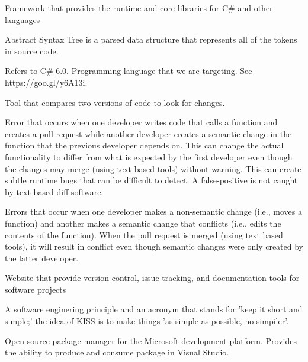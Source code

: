 \documentclass[draftclsnofoot,onecolumn]{IEEEtran}
\begin{document}
\begin{description} 

\item[.NET:] Framework that provides the runtime and core libraries for C\# 
and other languages

\item[AST:] Abstract Syntax Tree is a parsed data structure that represents 
all of the tokens in source code.

\item[C\#:] Refers to C\# 6.0. Programming language that we are targeting. 
See https://goo.gl/y6A13i.

\item[Diff:] Tool that compares two versions of code to look for changes.

\item[False-Positive:] Error that occurs when one developer writes code that 
calls a function and creates a pull request while another developer creates a 
semantic change in the function that the previous developer depends on. This 
can change the actual functionality to differ from what is expected by the 
first developer even though the changes may merge (using text based tools) 
without warning. This can create subtle runtime bugs that can be difficult to 
detect. A false-positive is not caught by text-based diff software.

\item[False-Negative:] Errors that occur when one developer makes a 
non-semantic change (i.e., moves a function) and another makes a semantic 
change that conflicts (i.e., edits the contents of the function). When the 
pull request is merged (using text based tools), it will result in conflict 
even though semantic changes were only created by the latter developer.

\item[GitHub:] Website that provide version control, issue tracking, and 
documentation tools for software projects

\item[KISS:] A software enginering principle and an acronym that stands for 
'keep it short and simple;' the idea of KISS is to make things 'as simple as 
possible, no simpiler'.

\item[NuGet Package:] Open-source package manager for the Microsoft 
development platform. Provides the ability to produce and consume package in 
Visual Studio.


\end{description}
\end{document}
